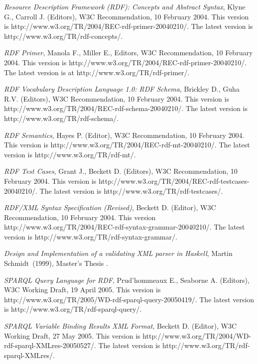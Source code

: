 \documentclass[11pt,a4paper,headsepline, bibtotoc]{scrreprt}
\begin{document}
\begin{thebibliography}{999}
\textit{Resource Description Framework (RDF): Concepts and Abstract Syntax}, Klyne G., Carroll J. (Editors), W3C Recommendation, 10 February 2004. This version is http://www.w3.org/TR/2004/REC-rdf-primer-20040210/. The latest version is http://www.w3.org/TR/rdf-concepts/.

\textit{RDF Primer}, Manola F., Miller E., Editors, W3C Recommendation, 10 February 2004. This version is http://www.w3.org/TR/2004/REC-rdf-primer-20040210/. The latest version is at http://www.w3.org/TR/rdf-primer/.

\textit{RDF Vocabulary Description Language 1.0: RDF Schema}, Brickley D., Guha R.V. (Editors), W3C Recommendation, 10 February 2004. This version is http://www.w3.org/TR/2004/REC-rdf-schema-20040210/. The latest version  is http://www.w3.org/TR/rdf-schema/.

\textit{RDF Semantics}, Hayes P. (Editor), W3C Recommendation, 10 February 2004. This version is http://www.w3.org/TR/2004/REC-rdf-mt-20040210/. The latest version is http://www.w3.org/TR/rdf-mt/.

\textit{RDF Test Cases}, Grant J., Beckett D. (Editors), W3C Recommendation, 10 February 2004. This version is http://www.w3.org/TR/2004/REC-rdf-testcases-20040210/. The latest version is http://www.w3.org/TR/rdf-testcases/.

\textit{RDF/XML Syntax Specification (Revised)}, Beckett D. (Editor), W3C Recommendation, 10 February 2004. This version http://www.w3.org/TR/2004/REC-rdf-syntax-grammar-20040210/. The latest version is http://www.w3.org/TR/rdf-syntax-grammar/.

{\it Design and Implementation of a validating XML parser in Haskell},
Martin Schmidt~(1999), Master's Thesis .

\textit{SPARQL Query Language for RDF}, Prud'hommeaux E., Seaborne A. (Editors), W3C Working Draft, 19 April 2005. This version is http://www.w3.org/TR/2005/WD-rdf-sparql-query-20050419/. The latest version is http://www.w3.org/TR/rdf-sparql-query/.

\textit{SPARQL Variable Binding Results XML Format}, Beckett D. (Editor), W3C Working Draft, 27 May 2005. This version is http://www.w3.org/TR/2004/WD-rdf-sparql-XMLres-20050527/. The latest version is http://www.w3.org/TR/rdf-sparql-XMLres/.


\end{thebibliography}
\end{document}
